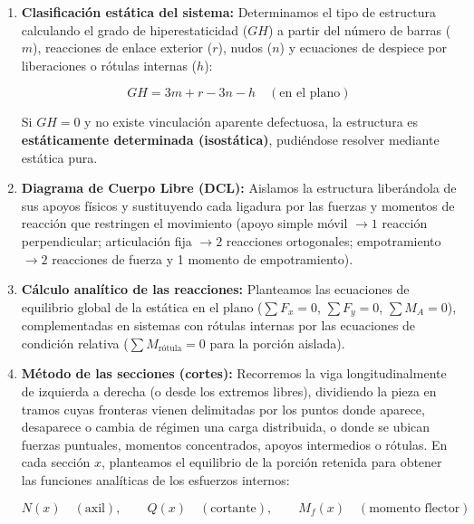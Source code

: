 \begin{enumerate}

    \item \textbf{Clasificación estática del sistema:} Determinamos el tipo de estructura calculando el grado de hiperestaticidad ($GH$) a partir del número de barras ($m$), reacciones de enlace exterior ($r$), nudos ($n$) y ecuaciones de despiece por liberaciones o rótulas internas ($h$):

          \[

              GH = 3m + r - 3n - h \quad (\text{en el plano})

          \]

          Si $GH = 0$ y no existe vinculación aparente defectuosa, la estructura es \textbf{estáticamente determinada (isostática)}, pudiéndose resolver mediante estática pura.



    \item \textbf{Diagrama de Cuerpo Libre (DCL):} Aislamos la estructura liberándola de sus apoyos físicos y sustituyendo cada ligadura por las fuerzas y momentos de reacción que restringen el movimiento (apoyo simple móvil $\to 1$ reacción perpendicular; articulación fija $\to 2$ reacciones ortogonales; empotramiento $\to 2$ reacciones de fuerza y 1 momento de empotramiento).



    \item \textbf{Cálculo analítico de las reacciones:} Planteamos las ecuaciones de equilibrio global de la estática en el plano ($\sum F_x = 0$, $\sum F_y = 0$, $\sum M_A = 0$), complementadas en sistemas con rótulas internas por las ecuaciones de condición relativa ($\sum M_{\text{rótula}} = 0$ para la porción aislada).



    \item \textbf{Método de las secciones (cortes):} Recorremos la viga longitudinalmente de izquierda a derecha (o desde los extremos libres), dividiendo la pieza en tramos cuyas fronteras vienen delimitadas por los puntos donde aparece, desaparece o cambia de régimen una carga distribuida, o donde se ubican fuerzas puntuales, momentos concentrados, apoyos intermedios o rótulas. En cada sección $x$, planteamos el equilibrio de la porción retenida para obtener las funciones analíticas de los esfuerzos internos:

          \[

              N(x) \quad (\text{axil}), \qquad Q(x) \quad (\text{cortante}), \qquad M_f(x) \quad (\text{momento flector})

\]
\end{enumerate}
